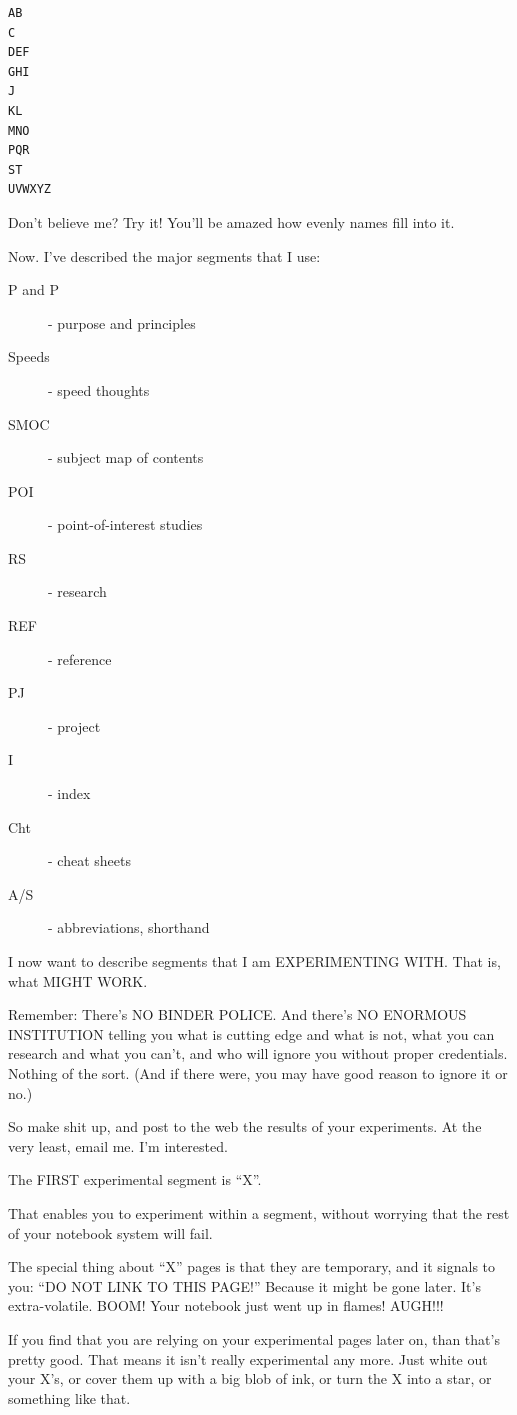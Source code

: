\documentclass[oneside]{book}
\begin{document}
\begin{verbatim}
AB
C
DEF
GHI
J
KL
MNO
PQR
ST
UVWXYZ
\end{verbatim}

  Don't believe me? Try it! You'll be amazed how evenly names fill
into it.

  Now.
  I've described the major segments that I use:

\begin{description}
\item[P and P]     - purpose and principles
\item[Speeds]  - speed thoughts
\item[SMOC]    - subject map of contents
\item[POI]     - point-of-interest studies
\item[RS]      - research
\item[REF]     - reference
\item[PJ]      - project
\item[I]       - index
\item[Cht]     - cheat sheets
\item[A/S]     - abbreviations, shorthand
\end{description}

  I now want to describe segments that I am EXPERIMENTING WITH.
  That is, what MIGHT WORK.

  Remember: There's NO BINDER POLICE.
  And there's NO ENORMOUS INSTITUTION telling you what is cutting edge
and what is not, what you can research and what you can't, and who
will ignore you without proper credentials. Nothing of the sort. (And
if there were, you may have good reason to ignore it or no.)

  So make shit up, and post to the web the results of your
experiments. At the very least, email me. I'm interested.

  The FIRST experimental segment is ``X''.

  That enables you to experiment within a segment, without worrying
that the rest of your notebook system will fail.

  The special thing about ``X'' pages is that they are temporary, and it
signals to you: ``DO NOT LINK TO THIS PAGE!'' Because it might be gone
later. It's extra-volatile. BOOM! Your notebook just went up in
flames! AUGH!!!

  If you find that you are relying on your experimental pages later
on, than that's pretty good. That means it isn't really experimental
any more. Just white out your X's, or cover them up with a big blob of
ink, or turn the X into a star, or something like that.
\end{document}
